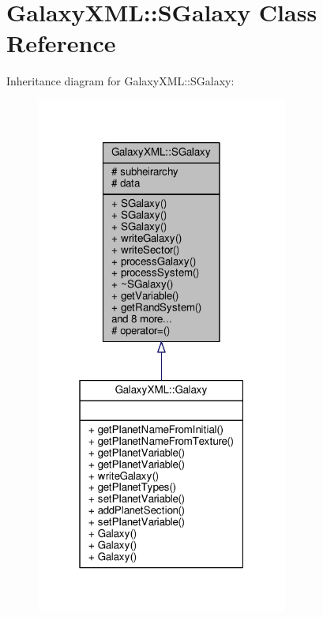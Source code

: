 \hypertarget{classGalaxyXML_1_1SGalaxy}{}\section{Galaxy\+X\+ML\+:\+:S\+Galaxy Class Reference}
\label{classGalaxyXML_1_1SGalaxy}


Inheritance diagram for Galaxy\+X\+ML\+:\+:S\+Galaxy\+:
\nopagebreak
\begin{figure}[H]
\begin{center}
\leavevmode
\includegraphics[width=235pt]{de/d4d/classGalaxyXML_1_1SGalaxy__inherit__graph}
\end{center}
\end{figure}


